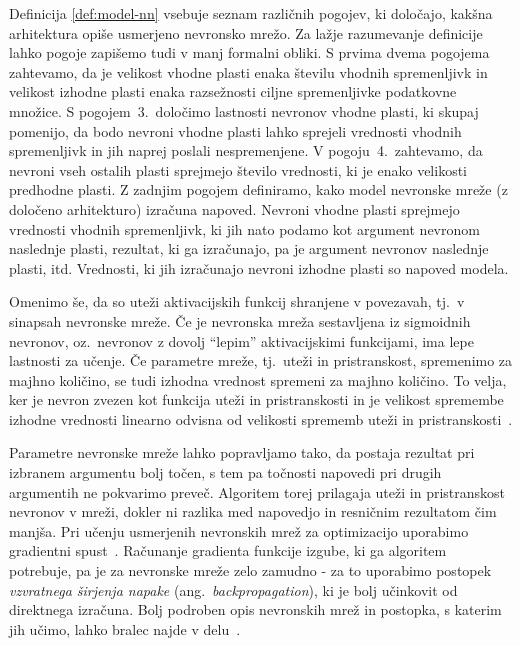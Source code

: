 \documentclass[12pt,a4paper,twoside]{article}
\theoremstyle{definition} %
\theoremstyle{plain} %
\numberwithin{equation}{section}  %
\begin{document}
Definicija \ref{def:model-nn} vsebuje seznam različnih pogojev, ki določajo, kakšna arhitektura opiše usmerjeno nevronsko mrežo. 
Za lažje razumevanje definicije lahko pogoje zapišemo tudi v manj formalni obliki.
S prvima dvema pogojema zahtevamo, da je velikost vhodne plasti enaka številu vhodnih spremenljivk in velikost izhodne plasti enaka razsežnosti ciljne spremenljivke podatkovne množice.
S pogojem~3.\ določimo lastnosti nevronov vhodne plasti, ki skupaj pomenijo, da bodo nevroni vhodne plasti lahko sprejeli vrednosti vhodnih spremenljivk in jih naprej poslali nespremenjene.
V pogoju~4.\ zahtevamo, da nevroni vseh ostalih plasti sprejmejo število vrednosti, ki je enako velikosti predhodne plasti.
Z zadnjim pogojem definiramo, kako model nevronske mreže (z določeno arhitekturo) izračuna napoved.
Nevroni vhodne plasti sprejmejo vrednosti vhodnih spremenljivk, ki jih nato podamo kot argument nevronom naslednje plasti, rezultat, ki ga izračunajo, pa je argument nevronov naslednje plasti, itd.
Vrednosti, ki jih izračunajo nevroni izhodne plasti so napoved modela.

Omenimo še, da so uteži aktivacijskih funkcij shranjene v povezavah, tj.\ v sinapsah nevronske mreže.
Če je nevronska mreža sestavljena iz sigmoidnih nevronov, oz.~nevronov z dovolj ``lepim'' aktivacijskimi funkcijami, ima lepe lastnosti za učenje. 
Če parametre mreže, tj.~uteži in pristranskost, spremenimo za majhno količino, se tudi izhodna vrednost spremeni za majhno količino. 
To velja, ker je nevron zvezen kot funkcija uteži in pristranskosti in je velikost spremembe izhodne vrednosti linearno odvisna od velikosti sprememb uteži in pristranskosti~\cite[pogl.\ 1]{nielsen2015neural}.

Parametre nevronske mreže lahko popravljamo tako, da postaja rezultat pri izbranem argumentu bolj točen, s tem pa točnosti napovedi pri drugih argumentih ne pokvarimo preveč. 
Algoritem torej prilagaja uteži in pristranskost nevronov v mreži, dokler ni razlika med napovedjo in resničnim rezultatom čim manjša. 
Pri učenju usmerjenih nevronskih mrež za optimizacijo uporabimo gradientni spust~\cite[pogl.\ 1]{nielsen2015neural}.
Računanje gradienta funkcije izgube, ki ga algoritem potrebuje, pa je za nevronske mreže zelo zamudno - za to uporabimo postopek \emph{vzvratnega širjenja napake} (ang.~\textsl{backpropagation}), ki je bolj učinkovit od direktnega izračuna. 
Bolj podroben opis nevronskih mrež in postopka, s katerim jih učimo, lahko bralec najde v delu~\cite[pogl.\ 2]{nielsen2015neural}.
\end{document}
